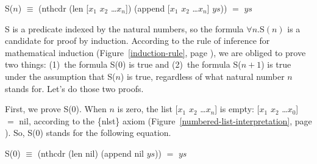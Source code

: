 \begin{samepage}
\begin{center}
\label{append-prefix-thm-predicate}
S($n$) $\equiv$ (nthcdr (len [$x_1$ $x_2$ \dots $x_n$]) (append [$x_1$ $x_2$ \dots $x_n$] $ys$)) $=$ $ys$
\end{center}
\end{samepage}


\label{append-suffix-thm-pencil-proof} 
S is a predicate indexed by the natural numbers,
so the formula $\forall n.$S$(n)$ is a candidate for proof by induction.
According to the rule of inference for mathematical induction
(Figure~\ref{induction-rule}, page \pageref{induction-rule}),
we are obliged to prove two things:
(1)~the formula S(0) is true and
(2)~the formula S($n+1$) is true under the assumption that S($n$) is true,
regardless of what natural number $n$ stands for. Let's do those two proofs.

First, we prove S(0).
When $n$ is zero, the list [$x_1$ $x_2$ \dots $x_n$] is empty:
[$x_1$ $x_2$ \dots $x_0$] $=$ nil, according to the \{nlst\} axiom
(Figure~\ref{numbered-list-interpretation}, page \pageref{numbered-list-interpretation}).
So, S(0) stands for the following equation.

\begin{samepage}
\begin{center}
S(0) $\equiv$ (nthcdr (len nil) (append nil $ys$)) $=$ $ys$
\end{center}
\end{samepage}


